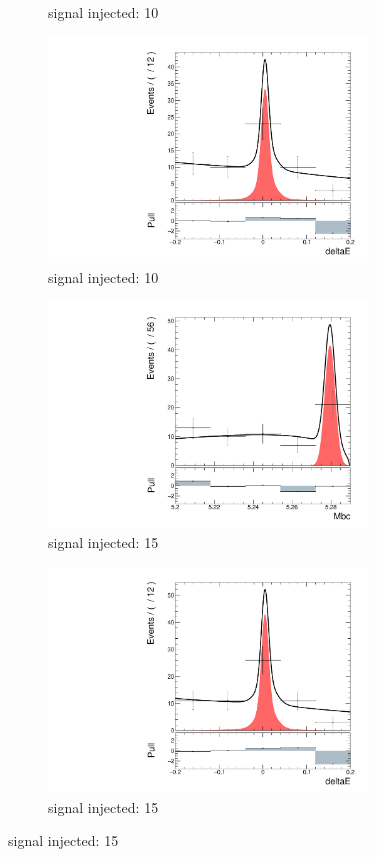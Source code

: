 \begin{figure}[htpb]
\begin{subfigure}{0.5\linewidth}
		\caption{signal injected: 10}
	\end{subfigure}
	\begin{subfigure}{0.5\linewidth}
		\includegraphics[page=1,height=6cm]{figures/injection_sig_10/ds_gen_deltaE_2D.pdf}
		\caption{signal injected: 10}
	\end{subfigure}
	\begin{subfigure}{0.5\linewidth}
		\includegraphics[page=1,height=6cm]{figures/injection_sig_15/ds_gen_Mbc_2D.pdf}
		\caption{signal injected: 15}
	\end{subfigure}
	\begin{subfigure}{0.5\linewidth}
		\includegraphics[page=1,height=6cm]{figures/injection_sig_15/ds_gen_deltaE_2D.pdf}
		\caption{signal injected: 15}
	\end{subfigure}
\end{figure}

